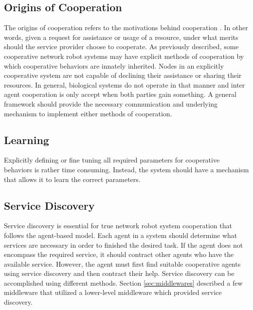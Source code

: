     \subsection{Origins of Cooperation}
      The origins of cooperation refers to the motivations behind cooperation
        \cite{Cao1997}.
      In other words, given a request for assistance or usage of a resource,
        under what merits should the service provider choose to cooperate.
      As previously described, some cooperative network robot systems may
        have explicit methods of cooperation by which cooperative behaviors
        are innately inherited.
      Nodes in an explicitly cooperative system are not capable of declining
        their assistance or sharing their resources.
      In general, biological systems do not operate in that manner and inter
        agent cooperation is only accept when both parties gain something.
      A general framework should provide the necessary communication
        and underlying mechanism to implement either methods of cooperation.

    \subsection{Learning}

      Explicitly defining or fine tuning all required parameters for cooperative
        behaviors is rather time consuming.
      Instead, the system should have a mechanism that allows it to learn the
        correct parameters.

    \subsection{Service Discovery}
      Service discovery is essential for true network robot system cooperation
        that follows the agent-based model.
      Each agent in a system should determine what services are necessary 
        in order to finished the desired task.
      If the agent does not encompass the required service, it should contract
        other agents who have the available service.
      However, the agent must first find suitable cooperative agents using service 
        discovery and then contract their help.
      Service discovery can be accomplished using different methods.
      Section \ref{sec:middlewares} described a few middleware that utilized a 
        lower-level middleware which provided service discovery.
    
